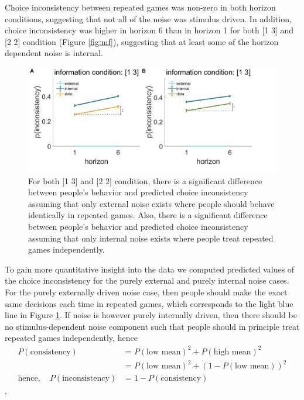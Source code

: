 \documentclass[12pt]{article}
\begin{document}
	Choice inconsistency between repeated games was non-zero in both horizon conditions, suggesting that not all of the noise was stimulus driven.  In addition, choice inconsistency was higher in horizon 6 than in horizon 1 for both [1 3] and [2 2] condition (Figure \ref{fig:mf}), suggesting that at least some of the horizon dependent noise is internal.
	
	\begin{figure}[H]
		\begin{center}
			\includegraphics[width=\textwidth]{figures/modelfree_intext.png}
			\caption{For both [1 3] and [2 2] condition, there is a significant difference between people's behavior and predicted choice inconsistency assuming that only external noise exists where people should behave identically in repeated games. Also, there is a significant difference between people's behavior and predicted choice inconsistency assuming that only internal noise exists where people treat repeated games independently. }
			\label{fig:mf2}
		\end{center}
	\end{figure}
	
	To gain more quantitative insight into the data we computed predicted values of the choice inconsistency for the purely external and purely internal noise cases.  For the purely externally driven noise case, then people should make the exact same decisions each time in repeated games, which corresponds to the light blue line in Figure \ref{fig:mf2}. If noise is however purely internally driven, then there should be no stimulus-dependent noise component such that people should in principle treat repeated games independently, hence 
	\begin{equation*}
	\begin{split}
	P(\mbox{consistency}) &= P(\mbox{low mean})^2 + P(\mbox{high mean})^2\\
	&= P(\mbox{low mean})^2 + (1-P(\mbox{low mean}))^2\\ \mbox{hence},\quad P(\mbox{inconsistency}) &= 1 - P(\mbox{consistency})
	\end{split}
	\end{equation*},
	
\end{document}

